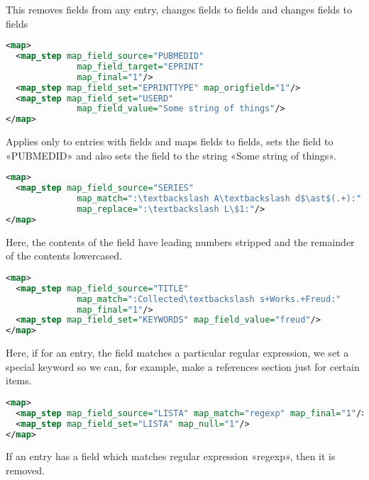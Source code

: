 \documentclass{ltxdockit}
\begin{document}
\noindent This removes  fields from any entry, changes
 fields to  fields and changes 
fields to  fields

\begin{lstlisting}[language=xml,escapechar=:,mathescape=true]
<map>
  <map_step map_field_source="PUBMEDID"
              map_field_target="EPRINT"
              map_final="1"/>
  <map_step map_field_set="EPRINTTYPE" map_origfield="1"/>
  <map_step map_field_set="USERD"
              map_field_value="Some string of things"/>
</map>
\end{lstlisting}

\noindent Applies only to entries with  fields and maps
 fields to  fields, sets the 
field to «PUBMEDID» and also sets the  field to the string
«Some string of things».

\begin{lstlisting}[language=xml,escapechar=:,mathescape=true]
<map>
  <map_step map_field_source="SERIES"
              map_match=":\textbackslash A\textbackslash d$\ast$(.+):"
              map_replace=":\textbackslash L\$1:"/>
</map>
\end{lstlisting}

\noindent Here, the contents of the 
field have leading numbers stripped and the remainder of the contents
lowercased.

\begin{lstlisting}[language=xml,escapechar=:,mathescape=true]
<map>
  <map_step map_field_source="TITLE"
              map_match=":Collected\textbackslash s+Works.+Freud:"
              map_final="1"/>
  <map_step map_field_set="KEYWORDS" map_field_value="freud"/>
</map>
\end{lstlisting}

\noindent Here, if for an entry, the  field matches a
particular regular expression, we set a special keyword so we can, for
example, make a references section just for certain items.

\begin{lstlisting}[language=xml,escapechar=:,mathescape=true]
<map>
  <map_step map_field_source="LISTA" map_match="regexp" map_final="1"/>
  <map_step map_field_set="LISTA" map_null="1"/>
</map>
\end{lstlisting}

\noindent If an entry has a  field which matches regular
expression «regexp», then it is removed.
\end{document}
